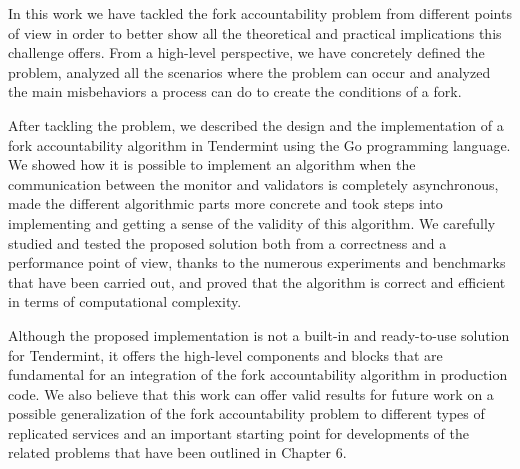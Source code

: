 \documentclass[a4paper,11pt,oneside]{report}
\begin{document}
In this work we have tackled the fork accountability problem from different points of view in order to better show all the theoretical and practical implications this challenge offers. From a high-level perspective, we have concretely defined the problem, analyzed all the scenarios where the problem can occur and analyzed the main misbehaviors a process can do to create the conditions of a fork.

After tackling the problem, we described the design and the implementation of a fork accountability algorithm in Tendermint using the Go programming language. We showed how it is possible to implement an algorithm when the communication between the monitor and validators is completely asynchronous, made the different algorithmic parts more concrete and took steps into implementing and getting a sense of the validity of this algorithm. We carefully studied and tested the proposed solution both from a correctness and a performance point of view, thanks to the numerous experiments and benchmarks that have been carried out, and proved that the algorithm is correct and efficient in terms of computational complexity. 

Although the proposed implementation is not a built-in and ready-to-use solution for Tendermint, it offers the high-level components and blocks that are fundamental for an integration of the fork accountability algorithm in production code. We also believe that this work can offer valid results for future work on a possible generalization of the fork accountability problem to different types of replicated services and an important starting point for developments of the related problems that have been outlined in Chapter 6.

\makeacks


\cleardoublepage
{}
{}
\printbibliography

%
%
\end{document}
